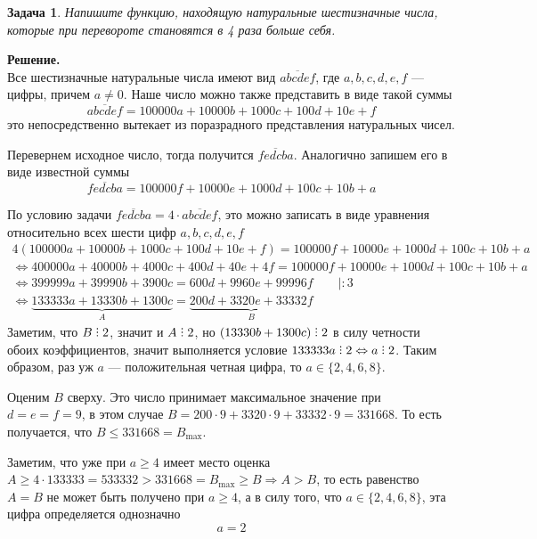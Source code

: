 \documentclass[12pt]{article}
\DeclareRobustCommand{\divby}{%
  \mathrel{\vbox{\baselineskip.65ex\lineskiplimit0pt\hbox{.}\hbox{.}\hbox{.}}}%
}
\newtheorem{problem}{Задача}
\newcommand\TheSolution{%
  \textbf{Решение.}\\%
}
\begin{document}
    \begin{problem}
        Напишите функцию, находящую натуральные шестизначные числа, которые при перевороте становятся в 4 раза больше себя.
    \end{problem}
    \TheSolution
    Все шестизначные натуральные числа имеют вид $\overline{abcdef}$, где $a, b, c, d, e, f$ — цифры, причем $a \neq 0$.
    Наше число можно также представить в виде такой суммы
    $$
        \overline{abcdef} = 100000a + 10000b + 1000c + 100d + 10e + f
    $$
    это непосредственно вытекает из поразрадного представления натуральных чисел.

    Перевернем исходное число, тогда получится $\overline{fedcba}$.
    Аналогично запишем его в виде известной суммы
    $$
        \overline{fedcba} = 100000f + 10000e + 1000d + 100c + 10b + a
    $$

    По условию задачи $\overline{fedcba} = 4 \cdot \overline{abcdef}$, это можно записать в виде уравнения относительно всех шести цифр $a, b, c, d, e, f$
    \begin{gather}
        4(100000a + 10000b + 1000c + 100d + 10e + f) = 100000f + 10000e + 1000d + 100c + 10b + a \nonumber \\
        \Longleftrightarrow 400000a + 40000b + 4000c + 400d + 40e + 4f = 100000f + 10000e + 1000d + 100c + 10b + a \nonumber \\
        \Longleftrightarrow 399999a + 39990b + 3900c = 600d + 9960e + 99996f \qquad |:3 \nonumber \\
        \Longleftrightarrow \underbrace{133333a + 13330b + 1300c}_A = \underbrace{200d + 3320e + 33332f}_B
    \end{gather}
    Заметим, что $B \divby 2$, значит и $A \divby 2$, но $(13330b + 1300c) \divby 2$ в силу четности обоих коэффициентов, значит выполняется условие $133333a \divby 2 \Leftrightarrow a \divby 2$. Таким образом, раз уж $a$ — положительная четная цифра, то $a \in \{2, 4, 6, 8\}$.

    Оценим $B$ сверху. Это число принимает максимальное значение при $d = e = f = 9$, в этом случае $B = 200\cdot9 + 3320\cdot9 + 33332\cdot9 = 331668$. То есть получается,
    что $B \leqslant 331668 = B_{\max}$.

    Заметим, что уже при $a \geqslant 4$ имеет место оценка $A \geqslant 4\cdot133333 = 533332 > 331668 = B_{\max} \geqslant B \Rightarrow A > B$,
    то есть равенство $A = B$ не может быть получено при $a \geqslant 4$, а в силу того, что $a \in \{2, 4, 6, 8\}$, эта цифра определяется однозначно
    $$
        \boxed{a = 2}
    $$
\end{document}
